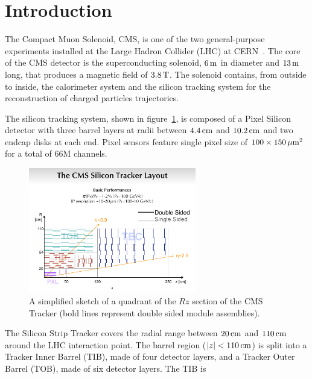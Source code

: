 \section{Introduction}
\label{introduction}

The Compact Muon Solenoid, CMS, is one of the two general-purpose
experiments installed at the Large Hadron Collider (LHC) at
CERN~\cite{cms}. The core of the CMS detector is
the superconducting solenoid, $6\rm \, m$ in diameter and $13\rm \, m$ long, that
produces a magnetic field of $3.8\rm \, T$. The solenoid contains, from
outside to inside, the calorimeter system and the silicon 
tracking system for the reconstruction of charged particles
trajectories.
 
The silicon tracking system, shown in figure~\ref{fig:tracker}, is composed of a Pixel
Silicon detector with three barrel layers at radii between $4.4\rm \, cm$
and $10.2\rm \, cm$ and two endcap disks at each end. Pixel sensors feature single pixel size
of $100\times150\, \mu \rm m^2$ for a total of 66M channels.  
\begin{figure}[t]
\includegraphics*[width=0.65\textwidth]{figs/layout_rz.pdf}\hspace{0.02\textwidth}%
\begin{minipage}[b]{0.33\textwidth}\caption{\label{fig:tracker}A simplified
    sketch of a quadrant of the $Rz$ section of the CMS Tracker (bold
    lines represent double sided module assemblies).}
\end{minipage}
\end{figure}
The Silicon Strip Tracker
covers the radial range between $20\rm \, cm$ and $110\rm \, cm$ around the LHC
interaction point. The barrel region ($| z |  < 110\rm \, cm$) is split into
a Tracker Inner Barrel (TIB), made of four detector layers, and a
Tracker Outer Barrel (TOB), made of six detector layers. The TIB is
